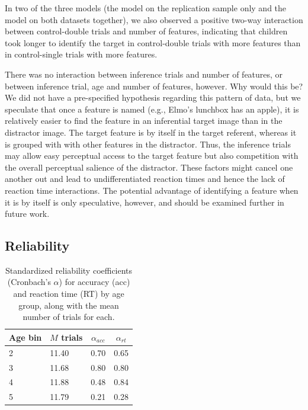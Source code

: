 \documentclass[mask,man]{apa6}
\begin{document}
In two of the three models (the model on the replication sample only and
the model on both datasets together), we also observed a positive
two-way interaction between control-double trials and number of
features, indicating that children took longer to identify the target in
control-double trials with more features than in control-single trials
with more features.

There was no interaction between inference trials and number of
features, or between inference trial, age and number of features,
however. Why would this be? We did not have a pre-specified hypothesis
regarding this pattern of data, but we speculate that once a feature is
named (e.g., Elmo's lunchbox has an apple), it is relatively easier to
find the feature in an inferential target image than in the distractor
image. The target feature is by itself in the target referent, whereas
it is grouped with with other features in the distractor. Thus, the
inference trials may allow easy perceptual access to the target feature
but also competition with the overall perceptual salience of the
distractor. These factors might cancel one another out and lead to
undifferentiated reaction times and hence the lack of reaction time
interactions. The potential advantage of identifying a feature when it
is by itself is only speculative, however, and should be examined
further in future work.

\subsection{Reliability}\label{reliability}

\begin{table}[tbp]
\begin{center}
\begin{threeparttable}
\caption{\label{tab:alphaTable}Standardized reliability coefficients (Cronbach's $\alpha$) for accuracy (acc) and reaction time (RT) by age group, along with the mean number of trials for each.}
\begin{tabular}{llll}
\toprule
Age bin & \multicolumn{1}{c}{$M$ trials} & \multicolumn{1}{c}{$\alpha_{acc}$} & \multicolumn{1}{c}{$\alpha_{rt}$}\\
\midrule
2 & 11.40 & 0.70 & 0.65\\
3 & 11.68 & 0.80 & 0.80\\
4 & 11.88 & 0.48 & 0.84\\
5 & 11.79 & 0.21 & 0.28\\
\bottomrule
\end{tabular}
\end{threeparttable}
\end{center}
\end{table}
\end{document}
